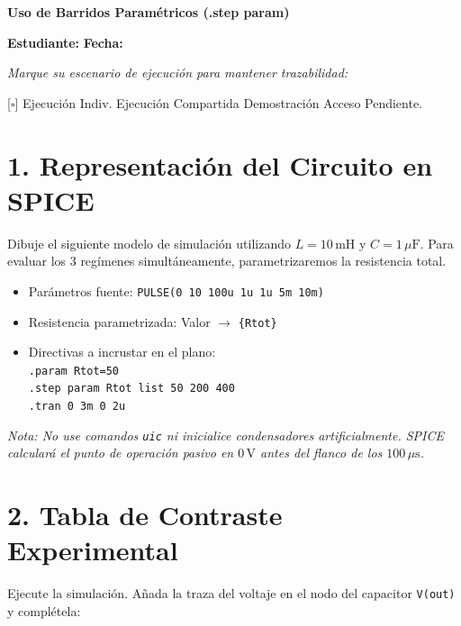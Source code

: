 \documentclass[11pt, a4paper]{article}
\begin{document}
\begin{tcolorbox}[colback=ucbblue!5!white, colframe=ucbblue, title=\textbf{Práctica de Simulación y Análisis de Discrepancias: Red RLC Serie}]
    \centering \textbf{Uso de Barridos Paramétricos (.step param)}
\end{tcolorbox}

\textbf{Estudiante:} \hrulefill \quad \textbf{Fecha:} \hrulefill

\vspace{0.3cm}
\begin{tcolorbox}[colback=gray!5, colframe=gray!50, title=\textbf{Modalidad de Evidencia Tecnológica}]
\textit{Marque su escenario de ejecución para mantener trazabilidad:} \par\vspace{0.2cm}
{[$\square$]} Ejecución Indiv. \quad {[$\square$]} Ejecución Compartida \quad {[$\square$]} Demostración \quad {[$\square$]} Acceso Pendiente.
\end{tcolorbox}

\section*{1. Representación del Circuito en SPICE}
Dibuje el siguiente modelo de simulación utilizando $L=10\,\text{mH}$ y $C=1\,\mu\text{F}$. Para evaluar los 3 regímenes simultáneamente, parametrizaremos la resistencia total.
\begin{itemize}
    \item Parámetros fuente: \texttt{PULSE(0 10 100u 1u 1u 5m 10m)}
    \item Resistencia parametrizada: Valor $\to$ \texttt{\{Rtot\}}
    \item Directivas a incrustar en el plano: \\
          \texttt{.param Rtot=50} \\
          \texttt{.step param Rtot list 50 200 400} \\
          \texttt{.tran 0 3m 0 2u}
\end{itemize}
\textit{Nota: No use comandos \texttt{uic} ni inicialice condensadores artificialmente. SPICE calculará el punto de operación pasivo en $0\,\text{V}$ antes del flanco de los $100\,\mu\text{s}$.}

\section*{2. Tabla de Contraste Experimental}
Ejecute la simulación. Añada la traza del voltaje en el nodo del capacitor \texttt{V(out)} y complétela:
\vspace{0.3cm}
\end{document}
